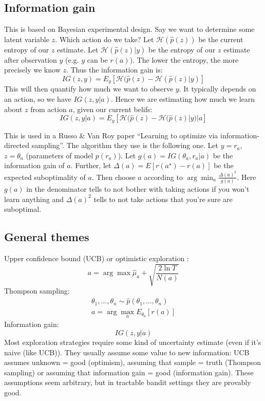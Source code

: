 \documentclass{report}
\newcommand{\argmin}{\arg\!\min}
\newcommand{\argmax}{\arg\!\max}
\begin{document}
\subsection{Information gain}
This is based on Bayesian experimental design.
Say we want to determine some latent variable $z$. Which action do we take?
Let $\mathcal{H}(\hat{p}(z))$ be the current entropy of our $z$ estimate.
Let $ \mathcal{H}(\hat{p}(z)|y)  $ be the entropy of our $z$ estimate after observation $y$ (e.g. $y$ can be $r(a)$).
The lower the entropy, the more precisely we know $z$.
Thus the information gain is:
\begin{equation}
		IG(z, y) = E_y \left[ \mathcal{H}(\hat{p}(z) - \mathcal{H}(\hat{p}(z)|y) \right] 
\end{equation}
This will then quantify how much we want to observe $y$.
It typically depends on an action, so we have $IG(z,y|a)$.
Hence we are estimating how much we learn about $z$ from action $a$, given our current belifs:
\begin{equation}
		IG(z, y|a) = E_y \left[ \mathcal{H}(\hat{p}(z) - \mathcal{H}(\hat{p}(z)|y)|a \right] 
\end{equation}

This is used in a Russo \& Van Roy paper ``Learning to optimize via information-directed sampling''.
The algorithm they use is the following one. Let $y=r_a$, $ z = \theta_a  $ (parameters of model $p(r_a)$).
Let $g(a) = IG(\theta_a, r_a|a)$  be the information gain of $a$. Further, let
$\Delta(a) = E \left[ r(a^\star) - r(a) \right] $ be the expected suboptimality of $a$.
Then choose $a$ according to $ \argmin_a \frac{\Delta (a)^2}{g(a)}   $.
Here $g(a)$ in the denominator tells to not bother with taking actions if you won't learn anything
and $\Delta (a)^2$ tells to not take actions that you're sure are suboptimal.

\subsection{General themes}
Upper confidence bound (UCB) or optimistic exploration :
\begin{equation}
		a = \argmax \hat{\mu}_a + \sqrt{ \frac{2\ln T}{N(a)}  }
\end{equation}
Thompson sampling:
\begin{gather}
		\theta_1, \dots, \theta_n \sim \hat{p} 	(\theta_1, \dots, \theta_n) \\
		a = \argmax_a E_{\theta_a} \left[ r(a) \right] 
\end{gather}
Information gain:
\begin{equation}
		IG(z,y|a)
\end{equation}
Most exploration strategies require some kind of uncertainty estimate (even if it's naive (like UCB)).
They usually assume some value to new information:
UCB assumes unknown = good (optimism), assuming that sample = truth (Thompson sampling) or
assuming that information gain = good (information gain).
These assumptions seem arbitrary, but in tractable bandit settings they are provably good.
\end{document}
